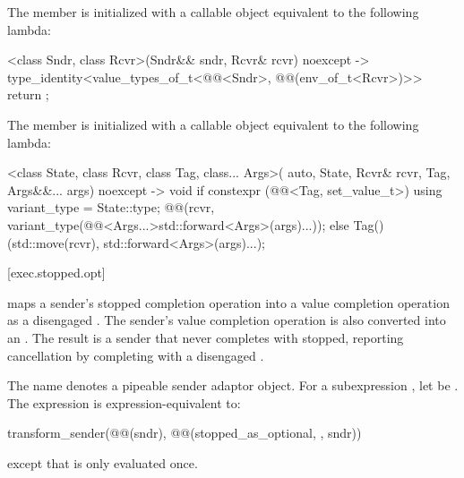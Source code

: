 \pnum
The member 
is initialized with a callable object equivalent to the following lambda:
\begin{codeblock}
[]<class Sndr, class Rcvr>(Sndr&& sndr, Rcvr& rcvr) noexcept
  -> type_identity<value_types_of_t<@@<Sndr>, @@(env_of_t<Rcvr>)>> {
  return {};
}
\end{codeblock}

\pnum
The member 
is initialized with a callable object equivalent to the following lambda:
\begin{codeblock}
[]<class State, class Rcvr, class Tag, class... Args>(
    auto, State, Rcvr& rcvr, Tag, Args&&... args) noexcept -> void {
  if constexpr (@@<Tag, set_value_t>) {
    using variant_type = State::type;
    @@(rcvr, variant_type(@@<Args...>{std::forward<Args>(args)...}));
  } else {
    Tag()(std::move(rcvr), std::forward<Args>(args)...);
  }
}
\end{codeblock}

[exec.stopped.opt]{}

\pnum
{} maps a sender's stopped completion operation
into a value completion operation as a disengaged .
The sender's value completion operation
is also converted into an .
The result is a sender that never completes with stopped,
reporting cancellation by completing with a disengaged .

\pnum
The name  denotes a pipeable sender adaptor object.
For a subexpression , let  be .
The expression  is expression-equivalent to:
\begin{codeblock}
transform_sender(@@(sndr), @@(stopped_as_optional, {}, sndr))
\end{codeblock}
except that  is only evaluated once.

